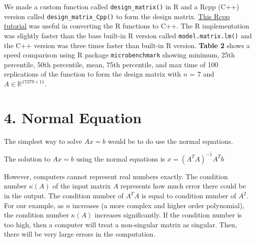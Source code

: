 \documentclass[
]{article}
\begin{document}
We made a custom function called \texttt{design\_matrix()} in R and a Rcpp (C++) version called \texttt{design\_matrix\_Cpp()} to form the design matrix. \color{blue}
\href{https://teuder.github.io/rcpp4everyone_en/index.html}{This Rcpp tutorial} 
\color{black} was useful in converting the R functions to C++. The R implementation was slightly faster than the base built-in R version called \texttt{model.matrix.lm()} and the C++ version was three times faster than built-in R version. \textbf{Table 2} shows a speed comparison using R package \texttt{microbenchmark} showing minimum, 25th percentile, 50th percentile, mean, 75th percentile, and max time of 100 replications of the function to form the design matrix with \(n\) = 7 and \(A \in \mathbb{R}^{17379 \times 11}\).

\hypertarget{normal-equation}{%
\section{4. Normal Equation}\label{normal-equation}}

The simplest way to solve \(Ax = b\) would be to do use the normal
equations.

The solution to \(Ax = b\) using the normal equations is
\(x = (A^{T}A)^{-1}A^{T}b\)

However, computers cannot represent real numbers exactly. The condition
number \(\kappa(A)\) of the input matrix \(A\) represents how much error
there could be in the output. The condition number of \(A^{T}A\) is
equal to condition number of \(A^{2}\). For our example, as \(n\)
increases (a more complex and higher order polynomial), the condition
number \(\kappa(A)\) increases significantly. If the condition number is
too high, then a computer will treat a non-singular matrix as singular.
Then, there will be very large errors in the computation.
\end{document}
